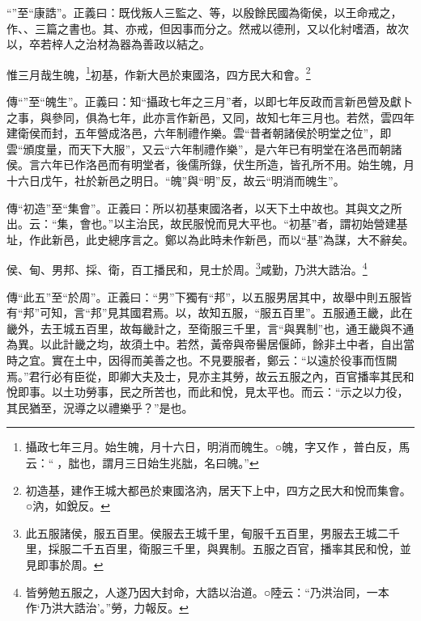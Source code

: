 {\noindent\shu{}\fzkt “”至“康誥”。正義曰：既伐叛人三監之、等，以殷餘民國為衛侯，以王命戒之，作、、三篇之書也。其、亦戒，但因事而分之。然戒以德刑，又以化紂嗜酒，故次以，卒若梓人之治材為器為善政以結之。 \par}

惟三月哉生魄，\footnote{攝政七年三月。始生魄，月十六日，明消而魄生。○魄，字又作𩲸，普白反，馬云：“𩲸，朏也，謂月三日始生兆朏，名曰魄。”}初基，作新大邑於東國洛，四方民大和會。\footnote{初造基，建作王城大都邑於東國洛汭，居天下上中，四方之民大和悅而集會。○汭，如銳反。}


{\noindent\zhuan{}\fzbyks 傳“”至“魄生”。正義曰：知“攝政七年之三月”者，以即七年反政而言新邑營及獻卜之事，與參同，俱為七年，此亦言作新邑，又同，故知七年三月也。若然，雲四年建衛侯而封，五年營成洛邑，六年制禮作樂。雲“昔者朝諸侯於明堂之位”，即雲“頒度量，而天下大服”，又云“六年制禮作樂”，是六年已有明堂在洛邑而朝諸侯。言六年已作洛邑而有明堂者，後儒所錄，伏生所造，皆孔所不用。始生魄，月十六日戊午，社於新邑之明日。“魄”與“明”反，故云“明消而魄生”。 \par}

{\noindent\zhuan{}\fzbyks 傳“初造”至“集會”。正義曰：所以初基東國洛者，以天下土中故也。其與文之所出。云：“集，會也。”以主治民，故民服悅而見大平也。“初基”者，謂初始營建基址，作此新邑，此史總序言之。鄭以為此時未作新邑，而以“基”為謀，大不辭矣。 \par}

侯、甸、男邦、採、衛，百工播民和，見士於周。\footnote{此五服諸侯，服五百里。侯服去王城千里，甸服千五百里，男服去王城二千里，採服二千五百里，衛服三千里，與異制。五服之百官，播率其民和悅，並見即事於周。}咸勤，乃洪大誥治。\footnote{皆勞勉五服之，人遂乃因大封命，大誥以治道。○陸云：“乃洪治同，一本作‘乃洪大誥治’。”勞，力報反。}

{\noindent\zhuan{}\fzbyks 傳“此五”至“於周”。正義曰：“男”下獨有“邦”，以五服男居其中，故舉中則五服皆有“邦”可知，言“邦”見其國君焉。以，故知五服，“服五百里”。五服通王畿，此在畿外，去王城五百里，故每畿計之，至衛服三千里，言“與異制”也，通王畿與不通為異。以此計畿之均，故須土中。若然，黃帝與帝嚳居偃師，餘非土中者，自出當時之宜。實在土中，因得而美善之也。不見要服者，鄭云：“以遠於役事而恆闕焉。”君行必有臣從，即卿大夫及士，見亦主其勞，故云五服之內，百官播率其民和悅即事。以土功勞事，民之所苦也，而此和悅，見太平也。而云：“示之以力役，其民猶至，況導之以禮樂乎？”是也。 \par}

